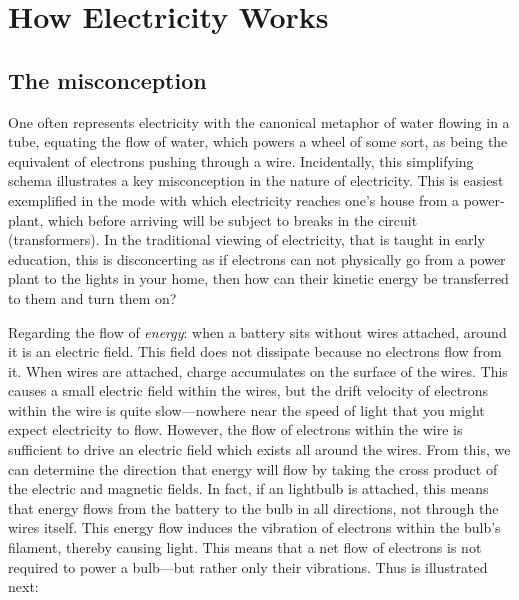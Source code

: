 \section{How Electricity Works} 
\subsection{The misconception} One often represents electricity with the canonical metaphor of water flowing in a tube, equating the flow of water, which powers a wheel of some sort, as being the equivalent of electrons pushing through a wire. Incidentally, this simplifying schema illustrates a key misconception in the nature of electricity. This is easiest exemplified in the mode with which electricity reaches one's house from a power-plant, which before arriving will be subject to breaks in the circuit (transformers). In the traditional viewing of electricity, that is taught in early education, this is disconcerting as if electrons can not physically go from a power plant to the lights in your home, then how can their kinetic energy be transferred to them and turn them on?\newline

Regarding the flow of \textit{energy}: when a battery sits without wires attached, around it is an electric field. This field does not dissipate because no electrons flow from it. When wires are attached, charge accumulates on the surface of the wires. This causes a small electric field within the wires, but the drift velocity of electrons within the wire is quite slow---nowhere near the speed of light that you might expect electricity to flow. However, the flow of electrons within the wire is sufficient to drive an electric field which exists all around the wires. From this, we can determine the direction that energy will flow by taking the cross product of the electric and magnetic fields. In fact, if an lightbulb is attached, this means that energy flows from the battery to the bulb in all directions, not through the wires itself. This energy flow induces the vibration of electrons within the bulb's filament, thereby causing light. This means that a net flow of electrons is not required to power a bulb---but rather only their vibrations. Thus is illustrated next:\newline 

